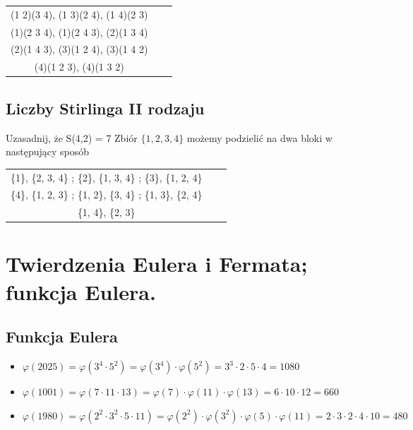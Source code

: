 \documentclass[12pt]{article}
\begin{document}
    \begin{center}
    \begin{tabular}{ c c c }
        (1 2)(3 4), (1 3)(2 4), (1 4)(2 3)\\
        (1)(2 3 4), (1)(2 4 3), (2)(1 3 4)\\
        (2)(1 4 3), (3)(1 2 4), (3)(1 4 2)\\
        (4)(1 2 3), (4)(1 3 2) 
    \end{tabular}
    \end{center}
    
    \subsection{Liczby Stirlinga II rodzaju}
    Uzasadnij, że S(4,2) = 7 \newline
    Zbiór $\{1,2,3,4\}$ możemy podzielić na dwa bloki w następujący sposób
    
    \begin{center}
    \begin{tabular}{ c c c }
        \{1\}, \{2, 3, 4\} ; \{2\}, \{1, 3, 4\} ; \{3\}, \{1, 2, 4\} \\
        \{4\}, \{1, 2, 3\} ; \{1, 2\}, \{3, 4\} ; \{1, 3\}, \{2, 4\} \\
        \{1, 4\}, \{2, 3\}
    \end{tabular}
    \end{center}
    \newpage

    \section{Twierdzenia Eulera i Fermata; funkcja Eulera.}
    \subsection{Funkcja Eulera}
    
    \begin{itemize}
        \item $\varphi(2025) = \varphi(3^4 \cdot 5^2) = \varphi(3^4) \cdot \varphi(5^2) = 3^3 \cdot 2 \cdot 5 \cdot 4 = 1080$
        \item $\varphi(1001) = \varphi(7\cdot11\cdot13) = \varphi(7) \cdot \varphi(11) \cdot \varphi(13) = 6 \cdot 10 \cdot12 = 660$
        \item $\varphi(1980) = \varphi(2^2 \cdot 3^2 \cdot 5 \cdot 11) = \varphi(2^2) \cdot \varphi(3^2) \cdot \varphi (5) \cdot \varphi(11) = 2 \cdot 3 \cdot 2 \cdot 4 \cdot 10 = 480$
    \end{itemize}
    
\end{document}

